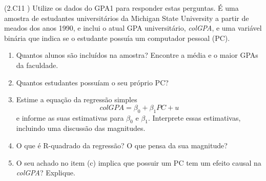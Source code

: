 \documentclass[12pt,letterpaper, onecolumn]{exam}
\begin{document}
\begin{questions}
    \question (2.C11 \citep{wooldridge2016}) Utilize os dados do GPA1 para responder estas perguntas. É uma amostra de estudantes universitários da Michigan State University a partir de meados dos anos 1990, e inclui o atual GPA universitário, \textit{colGPA}, e uma variável binária que indica se o estudante possuía um computador pessoal (PC).
    \begin{enumerate}[label = (\alph*)]
        \item Quantos alunos são incluídos na amostra? Encontre a média e o maior GPAs da faculdade.
        \item Quantos estudantes possuíam o seu próprio PC?
        \item Estime a equação da regressão simples \begin{equation*}
            colGPA = \beta_0 + \beta_1 PC + u
        \end{equation*} e informe as suas estimativas para $\beta_0$ e $\beta_1$. Interprete essas estimativas, incluindo uma discussão das magnitudes.
        \item O que é R-quadrado da regressão? O que pensa da sua magnitude?
        \item O seu achado no item (c) implica que possuir um PC tem um efeito causal na \textit{colGPA}? Explique.
    \end{enumerate}
    
\end{questions}

\end{document}
